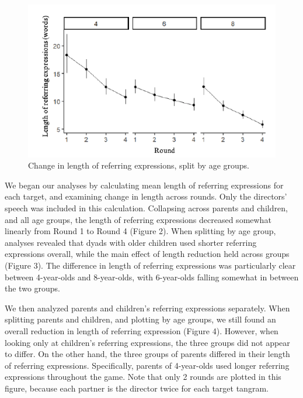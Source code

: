 \documentclass[10pt, letterpaper]{article}
\newenvironment{CodeChunk}{}{}
\begin{document}
\begin{CodeChunk}
\begin{figure}[h]

{\centering \includegraphics{figs/development-1} 

}

\caption[Change in length of referring expressions, split by age groups]{Change in length of referring expressions, split by age groups.}\label{fig:development}
\end{figure}
\end{CodeChunk}

We began our analyses by calculating mean length of referring
expressions for each target, and examining change in length across
rounds. Only the directors' speech was included in this calculation.
Collapsing across parents and children, and all age groups, the length
of referring expressions decreased somewhat linearly from Round 1 to
Round 4 (Figure 2). When splitting by age group, analyses revealed that
dyads with older children used shorter referring expressions overall,
while the main effect of length reduction held across groups (Figure 3).
The difference in length of referring expressions was particularly clear
between 4-year-olds and 8-year-olds, with 6-year-olds falling somewhat
in between the two groups.

We then analyzed parents and children's referring expressions
separately. When splitting parents and children, and plotting by age
groups, we still found an overall reduction in length of referring
expression (Figure 4). However, when looking only at children's
referring expressions, the three groups did not appear to differ. On the
other hand, the three groups of parents differed in their length of
referring expressions. Specifically, parents of 4-year-olds used longer
referring expressions throughout the game. Note that only 2 rounds are
plotted in this figure, because each partner is the director twice for
each target tangram.
\end{document}
